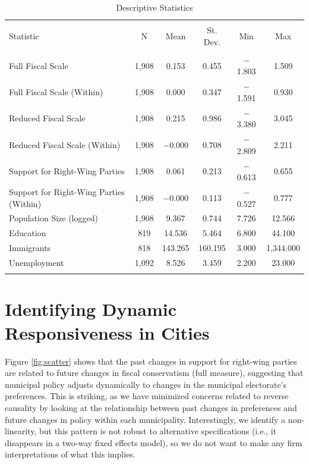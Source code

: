 \documentclass[a4paper,12pt]{article}
\begin{document}
\begin{table}[!htbp] \centering 
	\caption{Descriptive Statistics} 
	\label{tab:desc} 
		\begin{tabular}{@{\extracolsep{5pt}}lccccc} 
			\\[-1.8ex]\hline 
			\hline \\[-1.8ex] 
			Statistic & \multicolumn{1}{c}{N} & \multicolumn{1}{c}{Mean} & \multicolumn{1}{c}{St. Dev.} & \multicolumn{1}{c}{Min} & \multicolumn{1}{c}{Max} \\ 
			\hline \\[-1.8ex] 
			Full Fiscal Scale & 1,908 & 0.153 & 0.455 & $-$1.803 & 1.509 \\ 
			Full Fiscal Scale (Within) & 1,908 & 0.000 & 0.347 & $-$1.591 & 0.930 \\ 
			Reduced Fiscal Scale & 1,908 & 0.215 & 0.986 & $-$3.380 & 3.045 \\ 
			Reduced Fiscal Scale (Within) & 1,908 & $-$0.000 & 0.708 & $-$2.809 & 2.211 \\ 
			Support for Right-Wing Parties & 1,908 & 0.061 & 0.213 & $-$0.613 & 0.655 \\ 
			Support for Right-Wing Parties (Within) & 1,908 & $-$0.000 & 0.113 & $-$0.527 & 0.777 \\ 
			Population Size (logged) & 1,908 & 9.367 & 0.744 & 7.726 & 12.566 \\ 
			Education & 819 & 14.536 & 5.464 & 6.800 & 44.100 \\ 
			Immigrants & 818 & 143.265 & 160.195 & 3.000 & 1,344.000 \\ 
			Unemployment & 1,092 & 8.526 & 3.459 & 2.200 & 23.000 \\ 
			\hline \\[-1.8ex] 
		\end{tabular} 
\end{table} 



\section*{Identifying Dynamic Responsiveness in Cities}


Figure \ref{fig:scatter} shows that the past changes in support for right-wing parties are related to future changes in fiscal conservatism (full measure), suggesting that municipal policy adjusts dynamically to changes in the municipal electorate's preferences. This is striking, as we have minimized concerns related to reverse causality by looking at the relationship between past changes in preferences and future changes in policy within each municipality. Interestingly, we identify a non-linearity, but this pattern is not robust to alternative specifications (i.e., it disappears in a two-way fixed effects model), so we do not want to make any firm interpretations of what this implies.
\end{document}
